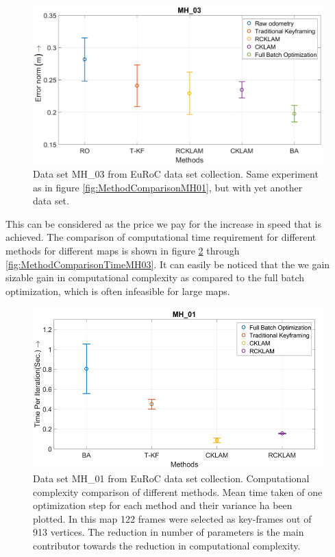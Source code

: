 \begin{figure}
	\centering
		\includegraphics[width=1.00\textwidth]{images/MethodComparisonMH03.png}
  \caption{Data set MH\_03 from EuRoC \cite{Burri25012016} data set collection. Same experiment as in figure \ref{fig:MethodComparisonMH01}, but with yet another data set.}
  \label{fig:MethodComparisonMH03}
\end{figure}

This can be considered as the price we pay for the increase in speed that is achieved. The comparison of computational time requirement for different methods for different maps is shown in figure \ref{fig:MethodComparisonTimeMH01} through \ref{fig:MethodComparisonTimeMH03}. It can easily be noticed that the we gain sizable gain in computational complexity as compared to the full batch optimization, which is often infeasible for large maps. 

\begin{figure}
	\centering
		\includegraphics[width=1.00\textwidth]{images/MethodComparisonTimeMH01.png}
  \caption{Data set MH\_01 from EuRoC \cite{Burri25012016} data set collection. Computational complexity comparison of different methods. Mean time taken of one optimization step for each method and their variance ha been plotted. In this map 122 frames were selected as key-frames out of 913 vertices. The reduction in number of parameters is the main contributor towards the reduction in computational complexity.}
  \label{fig:MethodComparisonTimeMH01}
\end{figure}


